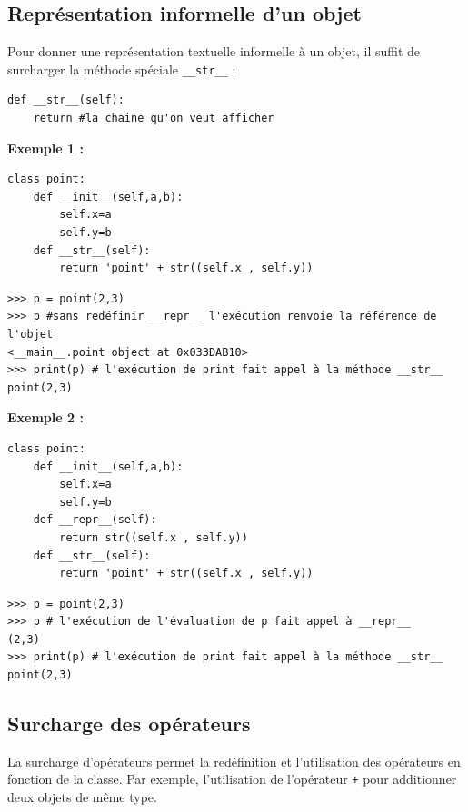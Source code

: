 \documentclass[a4paper,11pt]{article}
\theoremstyle{mytheor}
\begin{document}
\subsection{Représentation informelle d'un objet}

Pour donner une représentation textuelle informelle à un objet, il suffit de surcharger la méthode spéciale \Verb!__str__! :
\begin{lstlisting}
def __str__(self):
	return #la chaine qu'on veut afficher
\end{lstlisting}

\textbf{Exemple 1 :}

\begin{lstlisting}
class point:
	def __init__(self,a,b):
		self.x=a
		self.y=b
	def __str__(self):
		return 'point' + str((self.x , self.y))
\end{lstlisting}

\begin{Verbatim}[frame=leftline, framerule=1.5mm, rulecolor=\color{blue}]
>>> p = point(2,3)
>>> p #sans redéfinir __repr__ l'exécution renvoie la référence de l'objet
<__main__.point object at 0x033DAB10>
>>> print(p) # l'exécution de print fait appel à la méthode __str__
point(2,3)
\end{Verbatim}

\textbf{Exemple 2 :}

\begin{lstlisting}
class point:
	def __init__(self,a,b):
		self.x=a
		self.y=b
	def __repr__(self):
		return str((self.x , self.y))
	def __str__(self):
		return 'point' + str((self.x , self.y))
\end{lstlisting}



\begin{Verbatim}[frame=leftline, framerule=1.5mm, rulecolor=\color{blue}]
>>> p = point(2,3)
>>> p # l'exécution de l'évaluation de p fait appel à __repr__
(2,3)
>>> print(p) # l'exécution de print fait appel à la méthode __str__
point(2,3)
\end{Verbatim}

\subsection{Surcharge des opérateurs}
La surcharge d'opérateurs permet la redéfinition et l'utilisation des opérateurs en fonction de la classe. Par exemple, l'utilisation de l'opérateur \texttt{+} pour additionner deux objets de même type.
\end{document}
